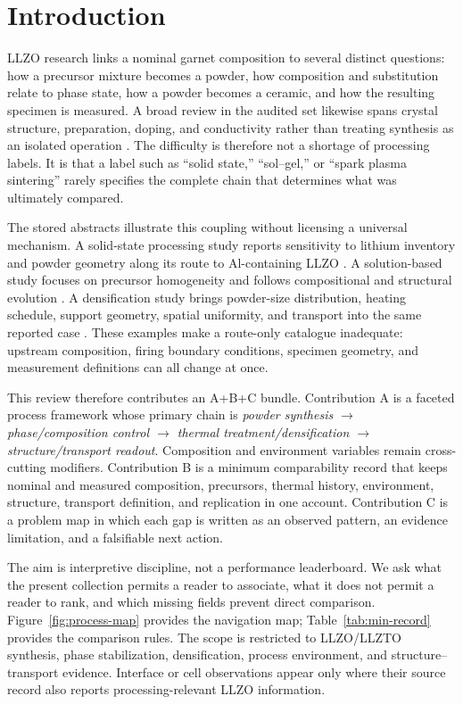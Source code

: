 \section{Introduction}

LLZO research links a nominal garnet composition to several distinct questions: how a precursor mixture becomes a powder, how composition and substitution relate to phase state, how a powder becomes a ceramic, and how the resulting specimen is measured. A broad review in the audited set likewise spans crystal structure, preparation, doping, and conductivity rather than treating synthesis as an isolated operation \cite{raju2021crystal}. The difficulty is therefore not a shortage of processing labels. It is that a label such as ``solid state,'' ``sol--gel,'' or ``spark plasma sintering'' rarely specifies the complete chain that determines what was ultimately compared.

The stored abstracts illustrate this coupling without licensing a universal mechanism. A solid-state processing study reports sensitivity to lithium inventory and powder geometry along its route to Al-containing LLZO \cite{heywood2023tailoring}. A solution-based study focuses on precursor homogeneity and follows compositional and structural evolution \cite{parascos2022compositional}. A densification study brings powder-size distribution, heating schedule, support geometry, spatial uniformity, and transport into the same reported case \cite{guo2023uniform}. These examples make a route-only catalogue inadequate: upstream composition, firing boundary conditions, specimen geometry, and measurement definitions can all change at once.

This review therefore contributes an A+B+C bundle. Contribution A is a faceted process framework whose primary chain is \emph{powder synthesis $\rightarrow$ phase\slash composition control $\rightarrow$ thermal treatment\slash densification $\rightarrow$ structure\slash transport readout}. Composition and environment variables remain cross-cutting modifiers. Contribution B is a minimum comparability record that keeps nominal and measured composition, precursors, thermal history, environment, structure, transport definition, and replication in one account. Contribution C is a problem map in which each gap is written as an observed pattern, an evidence limitation, and a falsifiable next action.

The aim is interpretive discipline, not a performance leaderboard. We ask what the present collection permits a reader to associate, what it does not permit a reader to rank, and which missing fields prevent direct comparison. Figure~\ref{fig:process-map} provides the navigation map; Table~\ref{tab:min-record} provides the comparison rules. The scope is restricted to LLZO\slash LLZTO synthesis, phase stabilization, densification, process environment, and structure--transport evidence. Interface or cell observations appear only where their source record also reports processing-relevant LLZO information.
